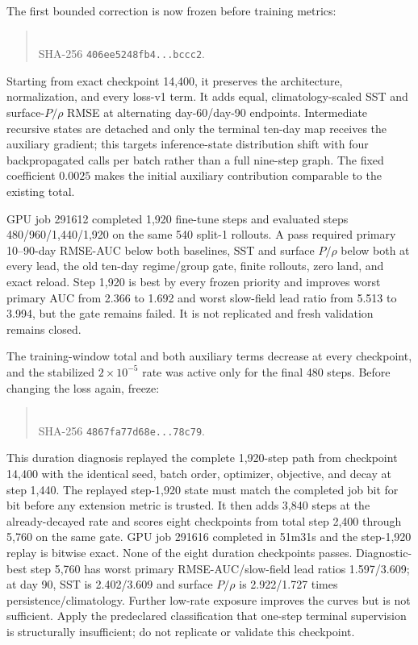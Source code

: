 \documentclass[11pt]{article}
\begin{document}
The first bounded correction is now frozen before training metrics:
\begin{quote}
\\
SHA-256 \texttt{406ee5248fb4...bccc2}.
\end{quote}
Starting from exact checkpoint 14,400, it preserves the architecture, normalization,
and every loss-v1 term.  It adds equal, climatology-scaled SST and surface-\(P/\rho\)
RMSE at alternating day-60/day-90 endpoints.  Intermediate recursive states are
detached and only the terminal ten-day map receives the auxiliary gradient; this
targets inference-state distribution shift with four backpropagated calls per batch
rather than a full nine-step graph.  The fixed coefficient \(0.0025\) makes the
initial auxiliary contribution comparable to the existing total.

GPU job 291612 completed 1,920 fine-tune steps and evaluated steps
480/960/1,440/1,920 on the same 540 split-1 rollouts.  A pass required primary
10--90-day RMSE-AUC below both baselines, SST and surface \(P/\rho\) below both at
every lead, the old ten-day regime/group gate, finite rollouts, zero land, and exact
reload.  Step 1,920 is best by every frozen priority and improves worst primary AUC
from 2.366 to 1.692 and worst slow-field lead ratio from 5.513 to 3.994, but the
gate remains failed.  It is not replicated and fresh validation remains closed.

The training-window total and both auxiliary terms decrease at every checkpoint, and
the stabilized \(2\times10^{-5}\) rate was active only for the final 480 steps.
Before changing the loss again, freeze:
\begin{quote}
\\
SHA-256 \texttt{4867fa77d68e...78c79}.
\end{quote}
This duration diagnosis replayed the complete 1,920-step path from checkpoint 14,400
with the identical seed, batch order, optimizer, objective, and decay at step 1,440.
The replayed step-1,920 state must match the completed job bit for bit before any
extension metric is trusted.  It then adds 3,840 steps at the already-decayed rate
and scores eight checkpoints from total step 2,400 through 5,760 on the same gate.
GPU job 291616 completed in 51m31s and the step-1,920 replay is bitwise exact.  None
of the eight duration checkpoints passes.  Diagnostic-best step 5,760 has worst
primary RMSE-AUC/slow-field lead ratios 1.597/3.609; at day 90, SST is
2.402/3.609 and surface \(P/\rho\) is 2.922/1.727 times
persistence/climatology.  Further low-rate exposure improves the curves but is not
sufficient.  Apply the predeclared classification that one-step terminal supervision
is structurally insufficient; do not replicate or validate this checkpoint.
\end{document}
